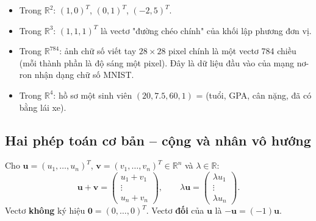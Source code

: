 \documentclass[12pt,a4paper]{article}
\begin{document}
\begin{center}
\end{center}

\begin{vidu}[title={Một số vectơ cụ thể}]
\begin{itemize}
  \item Trong $\mathbb{R}^2$: $(1, 0)^T$, $(0, 1)^T$, $(-2, 5)^T$.
  \item Trong $\mathbb{R}^3$: $(1, 1, 1)^T$ là vectơ "đường chéo chính" của khối lập phương đơn vị.
  \item Trong $\mathbb{R}^{784}$: ảnh chữ số viết tay $28 \times 28$ pixel chính là một vectơ 784 chiều (mỗi thành phần là độ sáng một pixel). Đây là dữ liệu đầu vào của mạng nơ-ron nhận dạng chữ số MNIST.
  \item Trong $\mathbb{R}^4$: hồ sơ một sinh viên $(20, 7.5, 60, 1)$ = (tuổi, GPA, cân nặng, đã có bằng lái xe).
\end{itemize}
\end{vidu}

\subsection{Hai phép toán cơ bản -- cộng và nhân vô hướng}

\begin{dinhnghia}
  Cho $\mathbf{u} = (u_1, \ldots, u_n)^T$, $\mathbf{v} = (v_1, \ldots, v_n)^T \in \mathbb{R}^n$ và $\lambda \in \mathbb{R}$:
  \[
    \mathbf{u} + \mathbf{v} = \begin{pmatrix} u_1+v_1 \\ \vdots \\ u_n+v_n \end{pmatrix}, \qquad
    \lambda \mathbf{u} = \begin{pmatrix} \lambda u_1 \\ \vdots \\ \lambda u_n \end{pmatrix}.
  \]
  Vectơ \textbf{không} ký hiệu $\mathbf{0} = (0, \ldots, 0)^T$. Vectơ \textbf{đối} của $\mathbf{u}$ là $-\mathbf{u} = (-1)\mathbf{u}$.
\end{dinhnghia}
\end{document}
